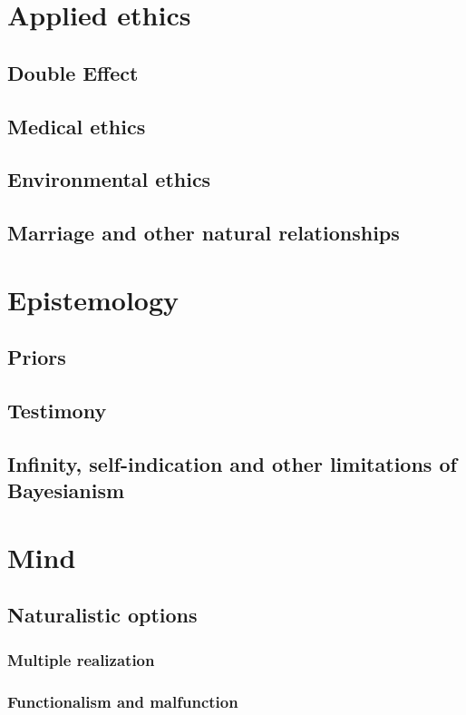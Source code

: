 
\def\mychapter{III}
\chapter{Applied ethics}\label{ch:applied-ethics}
\section{Double Effect}
\section{Medical ethics}
\section{Environmental ethics}
\section{Marriage and other natural relationships}
\chaptertail

\def\mychapter{IV}

\chapter{Epistemology}\label{ch:epistemology}
\section{Priors}
\section{Testimony}
\section{Infinity, self-indication and other limitations of Bayesianism}
\chaptertail 

\def\mychapter{V}

\chapter{Mind}\label{ch:mind}
\section{Naturalistic options}
\subsection{Multiple realization}
\subsection{Functionalism and malfunction}
